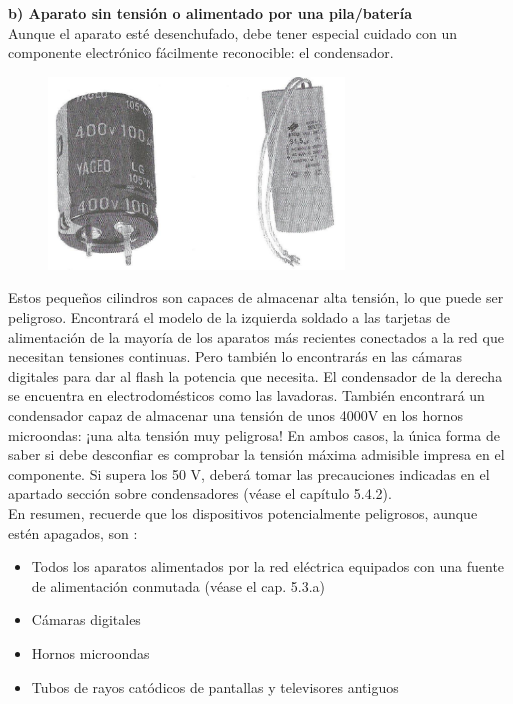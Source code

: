 \documentclass[a5paper,twoside,openany]{book}
\begin{document}
\textbf{b) Aparato sin tensión o alimentado por una pila/batería}\\
Aunque el aparato esté desenchufado, debe tener especial cuidado con
un componente electrónico fácilmente reconocible: el condensador.
\begin{figure}[h]
\includegraphics[width=0.7\textwidth]{condensadores} 
\centering
\end{figure}

Estos pequeños cilindros son capaces de almacenar alta tensión, lo que puede ser
peligroso.
Encontrará el modelo de la izquierda soldado a las tarjetas de alimentación de la mayoría de los aparatos más recientes conectados a la red que necesitan tensiones continuas. Pero también lo encontrarás en las cámaras digitales para dar al flash la potencia que necesita. El condensador de la derecha se encuentra en electrodomésticos como las lavadoras. También encontrará un condensador capaz de almacenar una tensión de unos 4000V en los hornos microondas: ¡una alta tensión muy peligrosa!
En ambos casos, la única forma de saber si debe desconfiar es
comprobar la tensión máxima admisible impresa en el componente.
Si supera los 50 V, deberá tomar las precauciones indicadas en el apartado
sección sobre condensadores (véase el capítulo 5.4.2).\\

En resumen, recuerde que los dispositivos potencialmente peligrosos, aunque estén apagados, son :
\begin{itemize}
\item Todos los aparatos alimentados por la red eléctrica equipados con una fuente de alimentación conmutada (véase el cap. 5.3.a)
\item Cámaras digitales
\item Hornos microondas
\item Tubos de rayos catódicos de pantallas y televisores antiguos
\end{itemize}
\newpage
\end{document}
